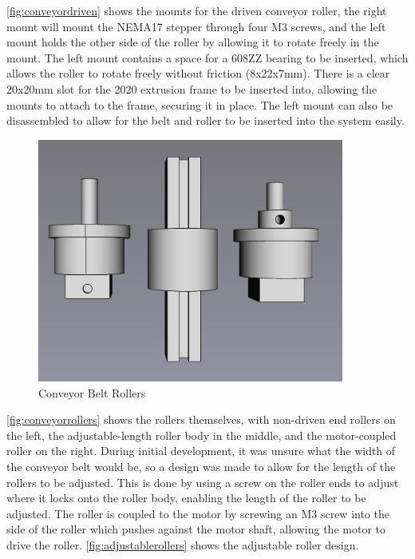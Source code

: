\autoref{fig:conveyordriven} shows the mounts for the driven conveyor roller, the right mount will mount the NEMA17 stepper through four M3 screws, and the left mount holds the other side of the roller by allowing it to rotate freely in the mount. The left mount contains a space for a 608ZZ bearing to be inserted, which allows the roller to rotate freely without friction (8x22x7mm). There is a clear 20x20mm slot for the 2020 extrusion frame to be inserted into, allowing the mounts to attach to the frame, securing it in place. The left mount can also be disassembled to allow for the belt and roller to  be inserted into the system easily.

\begin{figure}[H]
    \begin{minipage}[h]{0.95\textwidth}
        \centering
        \includegraphics[height=8cm]{imgs/freecad/rollers.jpg}
        \caption{Conveyor Belt Rollers}
        \label{fig:conveyorrollers}
    \end{minipage}
\end{figure}

\autoref{fig:conveyorrollers} shows the rollers themselves, with non-driven end rollers on the left, the adjustable-length roller body in the middle, and the motor-coupled roller on the right. During initial development, it was unsure what the width of the conveyor belt would be, so a design was made to allow for the length of the rollers to be adjusted. This is done by using a screw on the roller ends to adjust where it locks onto the roller body, enabling the length of the roller to be adjusted. The roller is coupled to the motor by screwing an M3 screw into the side of the roller which pushes against the motor shaft, allowing the motor to drive the roller. \autoref{fig:adjustablerollers} shows the adjustable roller design.

